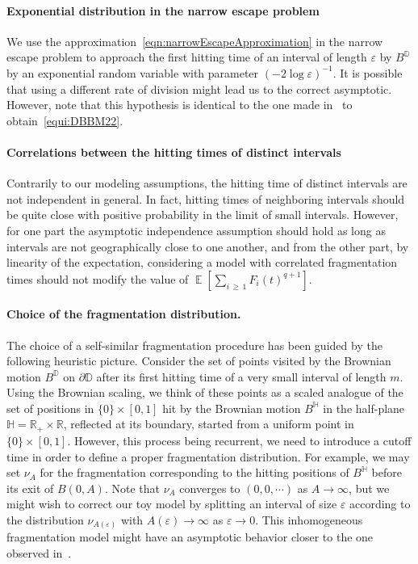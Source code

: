 \documentclass[AHL,Unicode,longabstracts,published]{cedram}
\newcommand{\R}{\mathbb{R}}
\newcommand{\D}{\mathbb{D}}
\renewcommand{\H}{\mathbb{H}}
\DeclareMathOperator{\E}{\mathbb{E}}
\renewcommand{\epsilon}{\varepsilon}
\begin{document}
\paragraph{Exponential distribution in the narrow escape problem}
We use the approximation~\eqref{eqn:narrowEscapeApproximation} in the narrow escape problem to approach the first hitting time of an interval of length $\epsilon$ by $B^{\D}$ by an exponential random variable with parameter $(-2\log \epsilon)^{-1}$. It is possible that using a different rate of division might lead us to the correct asymptotic. However, note that this hypothesis is identical to the one made in~\cite{DBBM22} to obtain~\eqref{equi:DBBM22}.


\paragraph{Correlations between the hitting times of distinct intervals}
Contrarily to our modeling assumptions, the hitting time of distinct intervals are not independent in general. In fact, hitting times of neighboring intervals should be quite close with positive probability in the limit of small intervals. However, for one part the asymptotic independence assumption should hold as long as intervals are not geographically close to one another, and from the other part, by linearity of the expectation, considering a model with correlated fragmentation times should not modify the value of $\E[\sum_{i\,\geq\,1} F_i(t)^{q+1}]$.


\paragraph{Choice of the fragmentation distribution.}
The choice of a self-similar fragmentation procedure has been guided by the following heuristic picture. Consider the set of points visited by the Brownian motion $B^{\D}$ on $\partial \D$ after its first hitting time of a very small interval of length $m$. Using the Brownian scaling, we think of these points as a scaled analogue of the set of positions in $\{0\}\times [0,1]$ hit by the Brownian motion $B^\H$ in the half-plane $\H = \R_+\times \R$, reflected at its boundary, started from a uniform point in $\{0\}\times [0,1]$. However, this process being recurrent, we need to introduce a cutoff time in order to define a proper fragmentation distribution. For example, we may set $\nu_A$ for the fragmentation corresponding to the hitting positions of $B^\H$ before its exit of $B(0,A)$. Note that $\nu_A$ converges to $(0,0,\cdots)$ as $A \to \infty$, but we might wish to correct our toy model by splitting an interval of size $\epsilon$ according to the distribution $\nu_{A(\epsilon)}$ with $A(\epsilon) \to \infty$ as $\epsilon \to 0$. This inhomogeneous fragmentation model might have an asymptotic behavior closer to the one observed in~\cite{DBBM22}.
\end{document}
